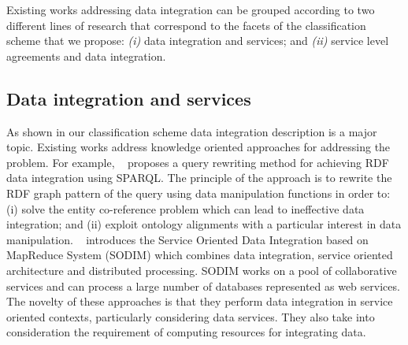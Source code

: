 Existing works addressing data integration can be grouped according to  two different lines of research that correspond to the facets of the  classification scheme that we propose:
\textit{(i)} data integration and services; and
\textit{(ii)} service level agreements and data integration. 


\subsection{Data integration and services}

As shown in our classification scheme data integration description is a major topic.  Existing works address knowledge oriented approaches for addressing the problem. For example, ~\cite{075} proposes a  query rewriting method for achieving RDF data integration
using SPARQL. The principle of the approach is to rewrite the RDF graph pattern of the query using data manipulation functions in order to: (i) solve 
the entity co-reference problem which can lead to ineffective data integration; 
and (ii) exploit ontology alignments with a particular interest in data manipulation. 
~\cite{078} introduces the  Service 
Oriented Data Integration based on MapReduce  System (SODIM)  which combines data integration,
service oriented architecture and distributed processing. SODIM works on a pool of collaborative services and can 
process a large number of databases represented as web services. 
The novelty of these approaches is that they perform data integration in service oriented contexts, particularly considering data services. They also take into consideration the requirement of computing resources for integrating data.


